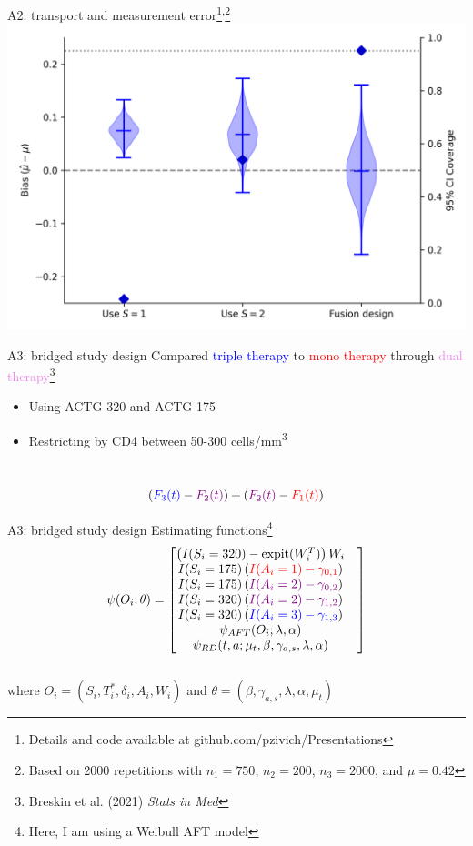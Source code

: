 \documentclass{beamer}
\newcommand{\blue}[1]{\textcolor{blue}{#1}}
\newcommand{\red}[1]{\textcolor{red}{#1}}
\newcommand{\violet}[1]{\textcolor{violet}{#1}}
\begin{document}
\begin{frame}{A2: transport and measurement error\footnote[frame]{Details and  code available at github.com/pzivich/Presentations}\textsuperscript{,}\footnote[frame]{Based on 2000 repetitions with $n_1=750$, $n_2=200$, $n_3=2000$, and $\mu=0.42$}}
	\centering 
	\includegraphics[scale=0.55]{images/sim_a2_results.png}
\end{frame}

\begin{frame}{A3: bridged study design}
	Compared \blue{triple therapy} to \red{mono therapy} through \violet{dual therapy}\footnote[frame]{Breskin et al. (2021) \textit{Stats in Med}}
	\begin{itemize}
		\item Using ACTG 320 and ACTG 175
		\item Restricting by CD4 between 50-300 cells/mm\textsuperscript{3}
	\end{itemize}~\\
	\[\left(\blue{F_3(t)} - \violet{F_2(t)}\right) + \left(\violet{F_2(t)} - \red{F_1(t)}\right)\]
\end{frame}

\begin{frame}{A3: bridged study design}
	Estimating functions\footnote[frame]{Here, I am using a Weibull AFT model}
	\[\psi(O_i; \theta) = 
	\begin{bmatrix}
		\left( I(S_i = 320) - \text{expit}(W_i^T) \right)W_i & \\
		I(S_i=175)\left(\red{I(A_i = 1) - \gamma_{0,1}} \right) & \\
		I(S_i=175)\left(\violet{I(A_i = 2) - \gamma_{0,2}} \right) & \\
		I(S_i=320)\left(\violet{I(A_i = 2) - \gamma_{1,2}} \right) & \\
		I(S_i=320)\left(\blue{I(A_i = 3) - \gamma_{1,3}} \right) & \\
		\psi_{AFT}(O_i; \lambda, \alpha) & \\
		\psi_{RD}(t, a; \mu_t, \beta, \gamma_{a,s}, \lambda, \alpha)
	\end{bmatrix}\]~\\
	where $O_i = (S_i, T_i^*, \delta_i, A_i, W_i)$ and $\theta = (\beta, \gamma_{a,s}, \lambda, \alpha, \mu_t)$
\end{frame}
\end{document}
